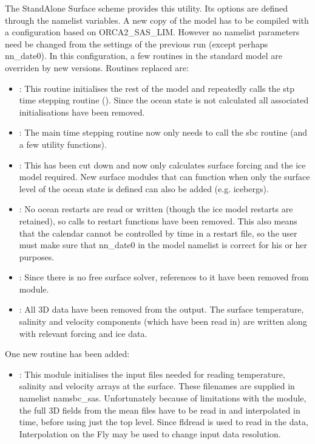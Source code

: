 \documentclass[../tex_main/NEMO_manual]{subfiles}
\begin{document}
The StandAlone Surface scheme provides this utility.
Its options are defined through the  namelist variables.
A new copy of the model has to be compiled with a configuration based on ORCA2\_SAS\_LIM.
However no namelist parameters need be changed from the settings of the previous run (except perhaps nn{\_}date0).
In this configuration, a few routines in the standard model are overriden by new versions.
Routines replaced are:

\begin{itemize}
\item
  :
  This routine initialises the rest of the model and repeatedly calls the stp time stepping routine ().
  Since the ocean state is not calculated all associated initialisations have been removed.
\item
  :
  The main time stepping routine now only needs to call the sbc routine (and a few utility functions).
\item
  :
  This has been cut down and now only calculates surface forcing and the ice model required.
  New surface modules that can function when only the surface level of the ocean state is defined can also be added
  (e.g. icebergs).
\item
  :
  No ocean restarts are read or written (though the ice model restarts are retained),
  so calls to restart functions have been removed.
  This also means that the calendar cannot be controlled by time in a restart file,
  so the user must make sure that nn{\_}date0 in the model namelist is correct for his or her purposes.
\item
  :
  Since there is no free surface solver, references to it have been removed from  module.
\item
  :
  All 3D data have been removed from the output.
  The surface temperature, salinity and velocity components (which have been read in) are written along with
  relevant forcing and ice data.
\end{itemize}

One new routine has been added:

\begin{itemize}
\item
  :
  This module initialises the input files needed for reading temperature, salinity and
  velocity arrays at the surface.
  These filenames are supplied in namelist namsbc{\_}sas.
  Unfortunately because of limitations with the  module,
  the full 3D fields from the mean files have to be read in and interpolated in time,
  before using just the top level.
  Since fldread is used to read in the data, Interpolation on the Fly may be used to change input data resolution.
\end{itemize}
\end{document}
